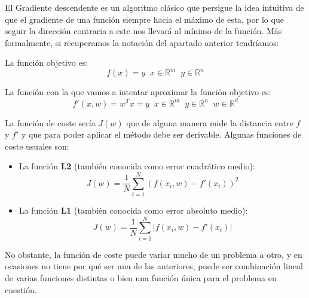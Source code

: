             \medskip
    
            \noindent El Gradiente descendente es un algoritmo clásico que persigue la idea intuitiva de que el gradiente de una función siempre  hacia el máximo de esta, por lo que seguir la dirección contraria a este nos llevará al mínimo de la función. Más formalmente, si recuperamos la notación del apartado anterior tendríamos: 
    
            \medskip
            
            \noindent La función objetivo es: 
            \begin{equation}
                f(x)=y \; \; x \in \mathbb{R}^m \; \; y \in \mathbb{R}^n
            \end{equation}
    
            \noindent La función con la que vamos a intentar aproximar la función objetivo es:
            \begin{equation}
                f'(x,w)=w^T x=y \; \; x \in \mathbb{R}^m \; \; y \in \mathbb{R}^n \; \; w \in \mathbb{R}^d 
            \end{equation}
    
            \noindent La función de coste sería $J(w)$ que de alguna manera mide la distancia entre $f$ y $f'$ y que para poder aplicar el método debe ser derivable. Algunas funciones de coste usuales son: 
    
            \begin{itemize}
                \item La función \textbf{L2} (también conocida como error cuadrático medio): 
                \begin{equation}
                    J(w)=\frac{1}{N} \sum_{i=1}^N(f(x_i,w)-f'(x_i))^2
                \end{equation}
                \item La función \textbf{L1} (también conocida como error absoluto medio): 
                \begin{equation}
                    J(w)=\frac{1}{N} \sum_{i=1}^N \left|f(x_i,w)-f'(x_i)\right|
                \end{equation}
            \end{itemize}
    
            \medskip

            \noindent No obstante, la función de coste puede variar mucho de un problema a otro, y en ocasiones no tiene por qué ser una de las anteriores, puede ser combinación lineal de varias funciones distintas o bien una función única para el problema en cuestión.

